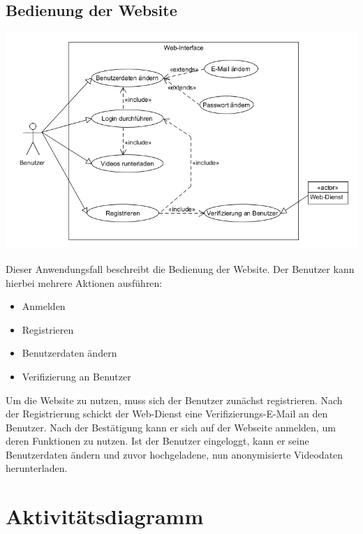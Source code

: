 \subsection{Bedienung der Website}
\begin{center}
\includegraphics[width=1\textwidth]{subtopicsFuncspec/Res/systemModels/WebsiteAWFDiagram.png}
\end{center}	
Dieser Anwendungsfall beschreibt die Bedienung der Website.
Der Benutzer kann hierbei mehrere Aktionen ausführen:
\begin{itemize}
\itemsep0pt
\item Anmelden
\item Registrieren
\item Benutzerdaten ändern
\item Verifizierung an Benutzer
\end{itemize}
Um die Website zu nutzen, muss sich der Benutzer zunächst registrieren. Nach der Registrierung schickt der \gls{Web-Dienst} eine Verifizierungs-\gls{E-Mail} an den Benutzer. Nach der Bestätigung kann er sich auf der Webseite anmelden, um deren Funktionen zu nutzen. Ist der Benutzer eingeloggt, kann er seine Benutzerdaten ändern und zuvor hochgeladene, nun anonymisierte Videodaten herunterladen.

\section{Aktivitätsdiagramm}
